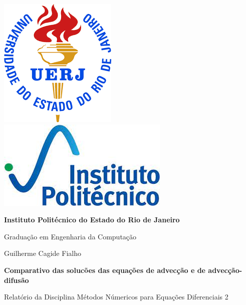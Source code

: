 \begin{titlepage}
    \centering

    \includegraphics[height=0.151\textwidth]{header/contra-capa/assets/uerj.png}\hfill
    \includegraphics[height=0.15\textwidth]{header/contra-capa/assets/iprj.jpeg}\hfill

    \vspace{2cm} %

    {\Large\bfseries Instituto Politécnico do Estado do Rio de Janeiro \par}
    \vspace{0.5cm}
    {\large Graduação em Engenharia da Computação \par}

    \vspace{3cm} %

    {\large Guilherme Cagide Fialho \par}

    \vspace{1.5cm}

    {\large\bfseries Comparativo das solucões das equações de advecção e de advecção-difusão \par}

    \vspace{1cm} %

    \begin{flushright}
        \begin{minipage}{0.5\textwidth}
            \large
            \raggedleft %
            Relatório da Disciplina Métodos Númericos para Equações Diferenciais 2
        \end{minipage}
    \end{flushright}


\end{titlepage}
